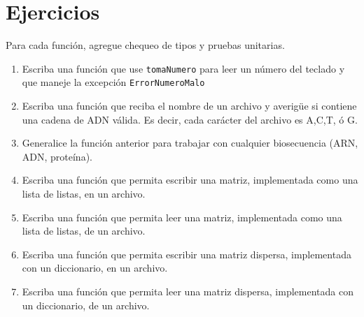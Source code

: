 \section{Ejercicios}

Para cada función, agregue chequeo de tipos y pruebas unitarias.
\begin{enumerate}
\item Escriba una función que use \texttt{tomaNumero} para leer un número
del teclado y que maneje la excepción \texttt{ErrorNumeroMalo}
\item Escriba una función que reciba el nombre de un archivo y averigüe
si contiene una cadena de ADN válida. Es decir, cada carácter del
archivo es A,C,T, ó G.
\item Generalice la función anterior para trabajar con cualquier biosecuencia
(ARN, ADN, proteína).
\item Escriba una función que permita escribir una matriz, implementada
como una lista de listas, en un archivo.
\item Escriba una función que permita leer una matriz, implementada como
una lista de listas, de un archivo.
\item Escriba una función que permita escribir una matriz dispersa, implementada
con un diccionario, en un archivo.
\item Escriba una función que permita leer una matriz dispersa, implementada
con un diccionario, de un archivo.
\end{enumerate}

